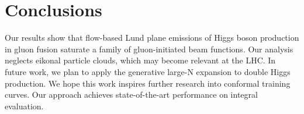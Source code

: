 \section{Conclusions}\label{sec:conclusions}

Our results show that flow-based Lund plane emissions of Higgs boson
production in gluon fusion saturate a family of gluon-initiated beam
functions. Our analysis neglects eikonal particle clouds, which may
become relevant at the LHC. In future work, we plan to apply the
generative large-N expansion to double Higgs production. We hope this
work inspires further research into conformal training curves. Our
approach achieves state-of-the-art performance on integral evaluation.

